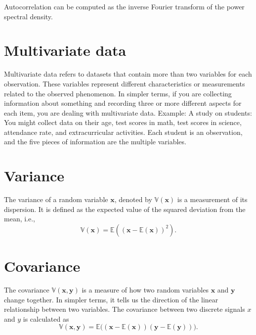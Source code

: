 \documentclass{article}
\begin{document}
Autocorrelation can be computed as the inverse Fourier transform of
the power spectral density.


\section{Multivariate data}
Multivariate data refers to datasets that contain more than two
variables for each observation. These variables represent different
characteristics or measurements related to the observed phenomenon. In
simpler terms, if you are collecting information about something and
recording three or more different aspects for each item, you are
dealing with multivariate data. Example: A study on students: You
might collect data on their age, test scores in math, test scores in
science, attendance rate, and extracurricular activities. Each student
is an observation, and the five pieces of information are the multiple
variables.

\section{Variance}
The variance of a random variable $\mathbf{x}$, denoted by
$\mathbb{V}(\mathbf{x})$ is a measurement of its dispersion. It is
defined as the expected value of the squared deviation from the mean,
i.e.,
\begin{equation}
  \mathbb{V}(\mathbf{x}) = \mathbb{E}\left((\mathbf{x} - \mathbb{E}(\mathbf{x}))^2 \right).
\end{equation}

\section{Covariance}
\label{sec:covariance}

The covariance $\mathbb{V}(\mathbf{x}, \mathbf{y})$ is a measure of
how two random variables $\mathbf{x}$ and $\mathbf{y}$ change
together. In simpler terms, it tells us the direction of the linear
relationship between two variables. The covariance between two
discrete signals $x$ and $y$ is calculated as
\begin{equation}
  \mathbb{V}(\textbf{x}, \textbf{y}) = \mathbb{E}\big((\mathbf{x}-\mathbb{E}(\mathbf{x}))(\mathbf{y}-\mathbb{E}(\mathbf{y}))\big).
\end{equation}
\end{document}
